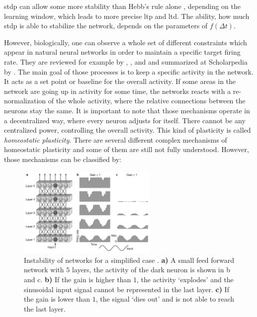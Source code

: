 \acs{stdp} can allow some more stability than Hebb's rule alone \parencite{abbott2000synaptic}, depending on the learning window, which leads to more precise \acs{ltp} and \acs{ltd}. The ability, how much \acs{stdp} is able to stabilize the network, depends on the parameters of $f(\Delta t)$.

However, biologically, one can observe a whole set of different constraints which appear in natural neural networks in order to maintain a specific target firing rate. They are reviewed for example by \textcite{turrigiano2004homeostatic}, \textcite{turrigiano2008self}, \textcite{pozo2010unraveling} and \textcite{turrigiano2012homeostatic} and summarized at Scholarpedia by \textcite{williams2013homeostatic}. The main goal of those processes is to keep a specific activity in the network. It acts as a set point or baseline for the overall activity. If some areas in the network are going up in activity for some time, the networks reacts with a re-normalization of the whole activity, where the relative connections between the neurons stay the same. It is important to note that those mechanisms operate in a decentralized way, where every neuron adjusts for itself. There cannot be any centralized power, controlling the overall activity. This kind of plasticity is called \emph{homeostatic plasticity}. There are several different complex mechanisms of homeostatic plasticity and some of them are still not fully understood. However, those mechanisms can be classified by:

\begin{figure}[t]
	\centering
	\includegraphics[width=0.6\textwidth]{neurons_plasticity/homeostatic-problem.png}
	\caption[Instability of networks]{Instability of networks for a simplified case \parencite[figure 1]{turrigiano2004homeostatic}. \textbf{a)} A small feed forward network with $5$ layers, the activity of the dark neuron is shown in b and c. \textbf{b)} If the gain is higher than $1$, the activity `explodes' and the sinusoidal input signal cannot be represented in the last layer. \textbf{c)} If the gain is lower than $1$, the signal `dies out' and is not able to reach the last layer.}
	\label{fig:homeo}
\end{figure}

